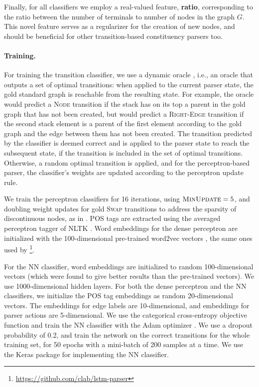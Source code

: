 \documentclass[11pt,a4paper]{article}
\begin{document}
Finally, for all classifiers we employ a real-valued feature,
\textbf{ratio}, corresponding to the ratio between the number of terminals to number of nodes
in the graph $G$.
This novel feature serves as a regularizer for the creation of new nodes,
and should be beneficial for other transition-based constituency parsers too.

\paragraph{Training.}
For training the transition classifier, we use a dynamic oracle \cite{goldberg2012dynamic},
i.e., an oracle that outputs a set of optimal transitions: when
applied to the current parser state, the gold
standard graph is reachable from the resulting state.
For example, the oracle would predict a \textsc{Node} transition if the stack 
has on its top a parent in the gold graph that has not been created,
but would predict a \textsc{Right-Edge} transition if the second stack
element is a parent of the
first element according to the gold graph and the edge between them has not been created.
The transition predicted by the classifier is deemed correct
and is applied to the parser state to reach the subsequent state,
if the transition is included in the set of optimal transitions.
Otherwise, a random optimal transition is applied,
and for the perceptron-based parser, the classifier's weights are updated according
to the perceptron update rule.

We train the perceptron classifiers for 16 iterations, using $\textsc{MinUpdate}=5$,
and doubling weight updates
for gold \textsc{Swap} transitions to address the sparsity of discontinuous nodes,
as in \citet{maier2015discontinuous}.
POS tags are extracted using the averaged perceptron tagger of NLTK \cite{bird2009natural}.
Word embeddings for the dense perceptron are initialized with the 100-dimensional pre-trained word2vec vectors \cite{mikolov2013efficient},
the same ones used by \citet{dyer2015transition}\footnote{
\url{https://github.com/clab/lstm-parser}}.

For the NN classifier, word embeddings are initialized to random
100-dimensional vectors (which were found to give better results than the pre-trained vectors). We use 1000-dimensional hidden layers.
For both the dense perceptron and the NN classifiers, we initialize the POS tag embeddings as random 20-dimensional vectors. The embeddings for edge labels are 10-dimensional, and embeddings for parser actions are 5-dimensional.
We use the categorical cross-entropy objective function and train the
NN classifier with the Adam optimizer \cite{kingma2014adam}. We use a dropout probability of 0.2,
and train the network on the correct transitions for the whole training set,
for 50 epochs with a mini-batch of 200 samples at a time.
We use the Keras package \cite{chollet2015keras} for implementing the NN classifier.
\end{document}
